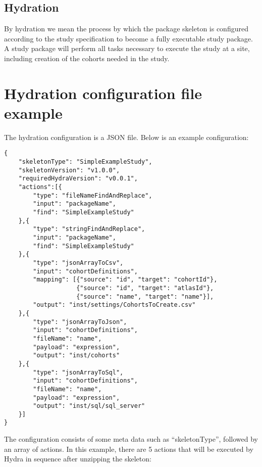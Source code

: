 \documentclass[]{article}
\begin{document}
\hypertarget{hydration}{%
\subsection{Hydration}\label{hydration}}

By hydration we mean the process by which the package skeleton is
configured according to the study specification to become a fully
executable study package. A study package will perform all tasks
necessary to execute the study at a site, including creation of the
cohorts needed in the study.

\hypertarget{hydration-configuration-file-example}{%
\section{Hydration configuration file
example}\label{hydration-configuration-file-example}}

The hydration configuration is a JSON file. Below is an example
configuration:

\begin{verbatim}
{
    "skeletonType": "SimpleExampleStudy",
    "skeletonVersion": "v1.0.0",
    "requiredHydraVersion": "v0.0.1",
    "actions":[{
        "type": "fileNameFindAndReplace",
        "input": "packageName",
        "find": "SimpleExampleStudy"
    },{
        "type": "stringFindAndReplace",
        "input": "packageName",
        "find": "SimpleExampleStudy"
    },{
        "type": "jsonArrayToCsv",
        "input": "cohortDefinitions",
        "mapping": [{"source": "id", "target": "cohortId"},
                    {"source": "id", "target": "atlasId"},
                    {"source": "name", "target": "name"}],
        "output": "inst/settings/CohortsToCreate.csv"
    },{
        "type": "jsonArrayToJson",
        "input": "cohortDefinitions",
        "fileName": "name",
        "payload": "expression",
        "output": "inst/cohorts"
    },{
        "type": "jsonArrayToSql",
        "input": "cohortDefinitions",
        "fileName": "name",
        "payload": "expression",
        "output": "inst/sql/sql_server"
    }]
}
\end{verbatim}

The configuration consists of some meta data such as ``skeletonType'',
followed by an array of actions. In this example, there are 5 actions
that will be executed by Hydra in sequence after unzipping the skeleton:
\end{document}
